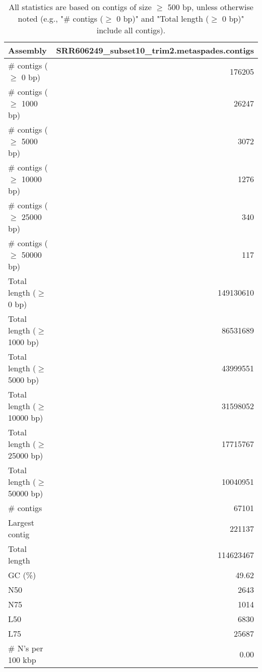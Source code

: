 \documentclass[12pt,a4paper]{article}
\begin{document}
\begin{table}[ht]
\begin{center}
\caption{All statistics are based on contigs of size $\geq$ 500 bp, unless otherwise noted (e.g., "\# contigs ($\geq$ 0 bp)" and "Total length ($\geq$ 0 bp)" include all contigs).}
\begin{tabular}{|l*{1}{|r}|}
\hline
Assembly & SRR606249\_subset10\_trim2.metaspades.contigs \\ \hline
\# contigs ($\geq$ 0 bp) & 176205 \\ \hline
\# contigs ($\geq$ 1000 bp) & 26247 \\ \hline
\# contigs ($\geq$ 5000 bp) & 3072 \\ \hline
\# contigs ($\geq$ 10000 bp) & 1276 \\ \hline
\# contigs ($\geq$ 25000 bp) & 340 \\ \hline
\# contigs ($\geq$ 50000 bp) & 117 \\ \hline
Total length ($\geq$ 0 bp) & 149130610 \\ \hline
Total length ($\geq$ 1000 bp) & 86531689 \\ \hline
Total length ($\geq$ 5000 bp) & 43999551 \\ \hline
Total length ($\geq$ 10000 bp) & 31598052 \\ \hline
Total length ($\geq$ 25000 bp) & 17715767 \\ \hline
Total length ($\geq$ 50000 bp) & 10040951 \\ \hline
\# contigs & 67101 \\ \hline
Largest contig & 221137 \\ \hline
Total length & 114623467 \\ \hline
GC (\%) & 49.62 \\ \hline
N50 & 2643 \\ \hline
N75 & 1014 \\ \hline
L50 & 6830 \\ \hline
L75 & 25687 \\ \hline
\# N's per 100 kbp & 0.00 \\ \hline
\end{tabular}
\end{center}
\end{table}
\end{document}
